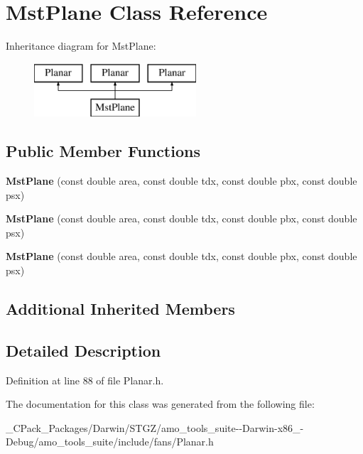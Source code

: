 \hypertarget{class_mst_plane}{}\section{Mst\+Plane Class Reference}
\label{class_mst_plane}
Inheritance diagram for Mst\+Plane\+:\begin{figure}[H]
\begin{center}
\leavevmode
\includegraphics[height=2.000000cm]{d5/dd0/class_mst_plane}
\end{center}
\end{figure}
\subsection*{Public Member Functions}
\begin{DoxyCompactItemize}
\item 
\mbox{\label{class_mst_plane_a7ecba572a4fbe043a4d9847c356c9ab5}} 
{\bfseries Mst\+Plane} (const double area, const double tdx, const double pbx, const double psx)
\item 
\mbox{\label{class_mst_plane_a7ecba572a4fbe043a4d9847c356c9ab5}} 
{\bfseries Mst\+Plane} (const double area, const double tdx, const double pbx, const double psx)
\item 
\mbox{\label{class_mst_plane_a7ecba572a4fbe043a4d9847c356c9ab5}} 
{\bfseries Mst\+Plane} (const double area, const double tdx, const double pbx, const double psx)
\end{DoxyCompactItemize}
\subsection*{Additional Inherited Members}


\subsection{Detailed Description}


Definition at line 88 of file Planar.\+h.



The documentation for this class was generated from the following file\+:\begin{DoxyCompactItemize}
\item 
\+\_\+\+C\+Pack\+\_\+\+Packages/\+Darwin/\+S\+T\+G\+Z/amo\+\_\+tools\+\_\+suite-\/-\/\+Darwin-\/x86\+\_-\/\+Debug/amo\+\_\+tools\+\_\+suite/include/fans/Planar.\+h\end{DoxyCompactItemize}
